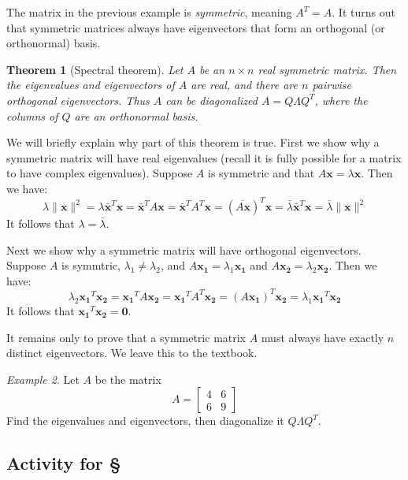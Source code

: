 \documentclass[11pt,oneside]{amsbook}
\theoremstyle{definition}
\theoremstyle{plain}
\newtheorem{theorem}{Theorem}[section]
\theoremstyle{definition}
\theoremstyle{remark}
\newtheorem{example}[theorem]{Example}
\numberwithin{equation}{section}
\numberwithin{figure}{section}
\begin{document}
The matrix in the previous example is \emph{symmetric}, meaning $A^T=A$. It turns out that symmetric matrices always have eigenvectors that form an orthogonal (or orthonormal) basis.

\begin{theorem}[Spectral theorem]
  Let $A$ be an $n\times n$ real symmetric matrix. Then the eigenvalues and eigenvectors of $A$ are real, and there are $n$ pairwise orthogonal eigenvectors. Thus $A$ can be diagonalized $A=Q\Lambda Q^T$, where the columns of $Q$ are an orthonormal basis.
\end{theorem}

We will briefly explain why part of this theorem is true. First we show why a symmetric matrix will have real eigenvalues (recall it is fully possible for a matrix to have complex eigenvalues). Suppose $A$ is symmetric and that $A\mathbf{x}=\lambda\mathbf{x}$. Then we have:
\[\lambda\|\mathbf{x}\|^2=\lambda \bar{\mathbf{x}}^T\mathbf{x}
  =\bar{\mathbf{x}}^TA\mathbf{x}
  =\bar{\mathbf{x}}^TA^T\mathbf{x}
  =(\overline{A\mathbf{x}})^T\mathbf{x}
  =\bar\lambda\bar{\mathbf{x}}^T\mathbf{x}
  =\bar\lambda\|\mathbf{x}\|^2
\]
It follows that $\lambda=\bar\lambda$.

Next we show why a symmetric matrix will have orthogonal eigenvectors. Suppose $A$ is symmtric, $\lambda_1\neq\lambda_2$, and $A\mathbf{x_1}=\lambda_1\mathbf{x_1}$ and $A\mathbf{x_2}=\lambda_2\mathbf{x_2}$. Then we have:
\[\lambda_2\mathbf{x_1}^T\mathbf{x_2}
  =\mathbf{x_1}^TA\mathbf{x_2}
  =\mathbf{x_1}^TA^T\mathbf{x_2}
  =(A\mathbf{x_1})^T\mathbf{x_2}
  =\lambda_1\mathbf{x_1}^T\mathbf{x_2}
\]
It follows that $\mathbf{x_1}^T\mathbf{x_2}=\mathbf{0}$.

It remains only to prove that a symmetric matrix $A$ must always have exactly $n$ distinct eigenvectors. We leave this to the textbook.

\begin{example}
  Let $A$ be the matrix
  \[A=\begin{bmatrix}4&6\\6&9\end{bmatrix}
  \]
  Find the eigenvalues and eigenvectors, then diagonalize it $Q\Lambda Q^T$.
\end{example}

\newpage
\subsection*{Activity for \S \thesection}
\end{document}
